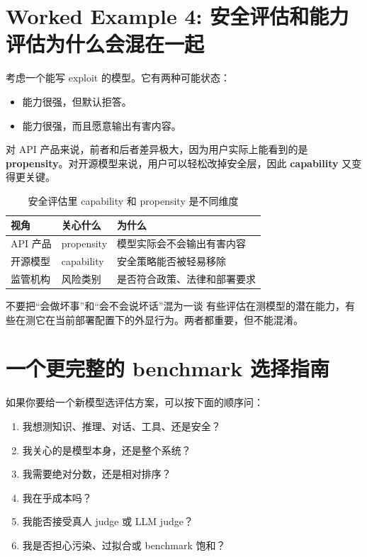 \documentclass[a4paper]{article}
\begin{document}
\section{Worked Example 4: 安全评估和能力评估为什么会混在一起}

考虑一个能写 exploit 的模型。它有两种可能状态：
\begin{itemize}
    \item 能力很强，但默认拒答。
    \item 能力很强，而且愿意输出有害内容。
\end{itemize}

对 API 产品来说，前者和后者差异极大，因为用户实际上能看到的是 \textbf{propensity}。对开源模型来说，用户可以轻松改掉安全层，因此 \textbf{capability} 又变得更关键。

\begin{table}[H]
\centering
\begin{tabular}{p{3.0cm}p{4.2cm}p{5.8cm}}
\toprule
\textbf{视角} & \textbf{关心什么} & \textbf{为什么} \\
\midrule
API 产品 & propensity & 模型实际会不会输出有害内容 \\
开源模型 & capability & 安全策略能否被轻易移除 \\
监管机构 & 风险类别 & 是否符合政策、法律和部署要求 \\
\bottomrule
\end{tabular}
\caption{安全评估里 capability 和 propensity 是不同维度}
\end{table}

\begin{warningbox}{不要把“会做坏事”和“会不会说坏话”混为一谈}
有些评估在测模型的潜在能力，有些在测它在当前部署配置下的外显行为。两者都重要，但不能混淆。
\end{warningbox}

\section{一个更完整的 benchmark 选择指南}

如果你要给一个新模型选评估方案，可以按下面的顺序问：
\begin{enumerate}
    \item 我想测知识、推理、对话、工具、还是安全？
    \item 我关心的是模型本身，还是整个系统？
    \item 我需要绝对分数，还是相对排序？
    \item 我在乎成本吗？
    \item 我能否接受真人 judge 或 LLM judge？
    \item 我是否担心污染、过拟合或 benchmark 饱和？
\end{enumerate}
\end{document}
